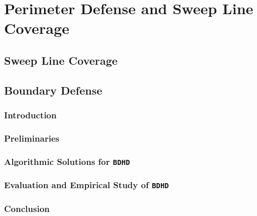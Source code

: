 
\chapter{Perimeter Defense and Sweep Line Coverage}
\thispagestyle{myheadings}
\section{Sweep Line Coverage}







\section{Boundary Defense}
\def\prob{{\texttt{{BDHD}}}\xspace}
\def\ours{{{{EDP}}}\xspace}
\def\oours{{{{OEDP}}}\xspace}
\subsection{Introduction}
\label{sec:bd-intro}
\subsection{Preliminaries}\label{sec:bd-preliminary}

\label{sec:bd-structure}
\subsection{Algorithmic Solutions for \prob}\label{sec:bd-algorithm}

\subsection{Evaluation and Empirical Study of \prob}\label{sec:bd-evaluation}

\subsection{Conclusion}\label{sec:bd-conclusion}

